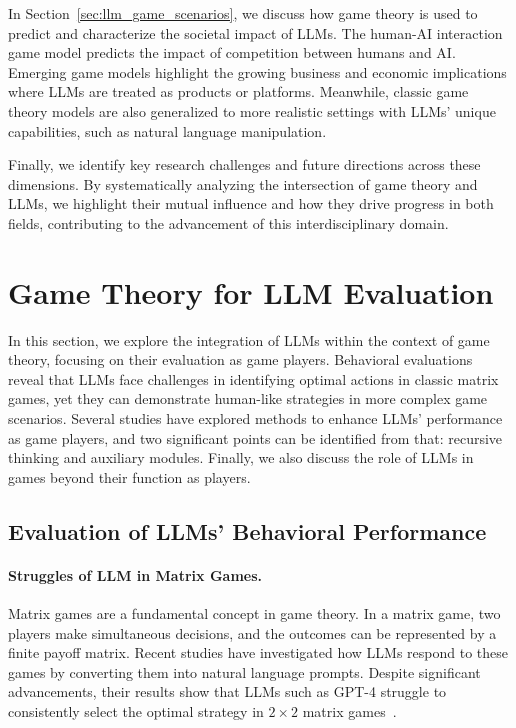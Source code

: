In Section~\ref{sec:llm_game_scenarios}, we discuss how game theory is used to predict and characterize the societal impact of LLMs. 
The human-AI interaction game model predicts the impact of competition between humans and AI. 
Emerging game models highlight the growing business and economic implications where LLMs are treated as products or platforms. 
Meanwhile, classic game theory models are also generalized to more realistic settings with LLMs' unique capabilities, such as natural language manipulation.

Finally, we identify key research challenges and future directions across these dimensions.
By systematically analyzing the intersection of game theory and LLMs, we highlight their mutual influence and how they drive progress in both fields, contributing to the advancement of this interdisciplinary domain.



\section{Game Theory for LLM Evaluation}\label{sec:llm_play_game}
In this section, we explore the integration of LLMs within the context of game theory, focusing on their evaluation as game players.
Behavioral evaluations reveal that LLMs face challenges in identifying optimal actions in classic matrix games, yet they can demonstrate human-like strategies in more complex game scenarios. 
Several studies have explored methods to enhance LLMs' performance as game players, and two significant points can be identified from that: recursive thinking and auxiliary modules. 
Finally, we also discuss the role of LLMs in games beyond their function as players.

\subsection{Evaluation of LLMs' Behavioral Performance}\label{sec:llm_play_game_obs}
\paragraph{Struggles of LLM in Matrix Games.}
Matrix games are a fundamental concept in game theory. 
In a matrix game, two players make simultaneous decisions, and the outcomes can be represented by a finite payoff matrix. 
Recent studies have investigated how LLMs respond to these games by converting them into natural language prompts. 
Despite significant advancements, their results show that LLMs such as GPT-4 struggle to consistently select the optimal strategy in $2 \times 2$ matrix games~\cite{akata2023playing,herr2024large,lore2024strategic,wang2024tmgbench}. 

